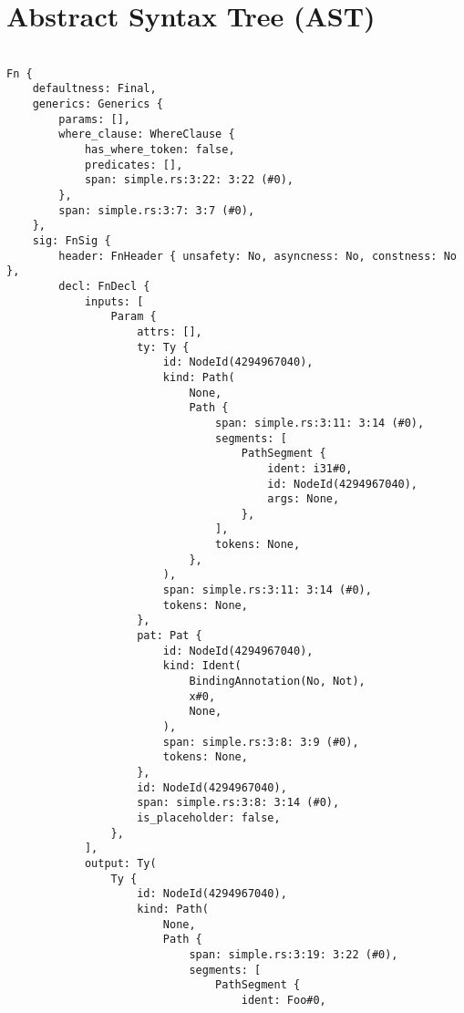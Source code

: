 \documentclass[
  11pt,
  twoside,symmetric]{report}
\begin{document}
\clearpage

\section{Abstract Syntax Tree (AST)}\label{sec:abstract-syntax-tree-ast}

\begin{verbatim}

Fn {
    defaultness: Final,
    generics: Generics {
        params: [],
        where_clause: WhereClause {
            has_where_token: false,
            predicates: [],
            span: simple.rs:3:22: 3:22 (#0),
        },
        span: simple.rs:3:7: 3:7 (#0),
    },
    sig: FnSig {
        header: FnHeader { unsafety: No, asyncness: No, constness: No },
        decl: FnDecl {
            inputs: [
                Param {
                    attrs: [],
                    ty: Ty {
                        id: NodeId(4294967040),
                        kind: Path(
                            None,
                            Path {
                                span: simple.rs:3:11: 3:14 (#0),
                                segments: [
                                    PathSegment {
                                        ident: i31#0,
                                        id: NodeId(4294967040),
                                        args: None,
                                    },
                                ],
                                tokens: None,
                            },
                        ),
                        span: simple.rs:3:11: 3:14 (#0),
                        tokens: None,
                    },
                    pat: Pat {
                        id: NodeId(4294967040),
                        kind: Ident(
                            BindingAnnotation(No, Not),
                            x#0,
                            None,
                        ),
                        span: simple.rs:3:8: 3:9 (#0),
                        tokens: None,
                    },
                    id: NodeId(4294967040),
                    span: simple.rs:3:8: 3:14 (#0),
                    is_placeholder: false,
                },
            ],
            output: Ty(
                Ty {
                    id: NodeId(4294967040),
                    kind: Path(
                        None,
                        Path {
                            span: simple.rs:3:19: 3:22 (#0),
                            segments: [
                                PathSegment {
                                    ident: Foo#0,

\end{verbatim}
\end{document}
